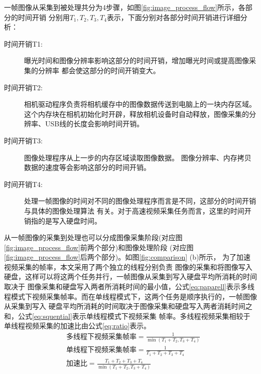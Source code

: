 	一帧图像从采集到被处理共分为4步骤，如图\ref{fig:image_process_flow}所示，各部分的时间开销
	分别用$T_1,T_2,T_3,T_4$表示，下面分别对各部分时间开销进行详细分析：
	\begin{description}
    \item[时间开销T1:] 曝光时间和图像分辨率影响这部分的时间开销，增加曝光时间或提高图像采集的分辨率
	都会使这部分的时间开销变大。
    \item[时间开销T2:] 相机驱动程序负责将相机缓存中的图像数据传送到电脑上的一块内存区域。
	这个内存块在相机初始化时开辟，释放相机设备时自动释放，图像采集的分辨率、USB线的长度会影响时间开销。
    \item[时间开销T3:] 图像处理程序从上一步的内存区域读取图像数据。
					图像分辨率、内存拷贝数据的速度等会影响这部分的时间开销。
	\item[时间开销T4:] 处理一帧图像的时间对不同的图像处理程序而言是不同，这部分的时间开销与具体的图像处理算法
	有关。对于高速视频采集任务而言，这里的时间开销指的是写入硬盘时间。
	\end{description}
	从一帧图像的采集到处理也可以分成图像采集阶段(对应图\ref{fig:image_process_flow}前两个部分)和图像处理阶段
	(对应图\ref{fig:image_process_flow}后两个部分)。如图\ref{fig:comparison} (b)所示，
	为了加速视频采集的帧率，本文采用了两个独立的线程分别负责
	图像的采集和将图像写入硬盘，这样可以将这两个任务并行，一帧图像从采集到写入硬盘平均所消耗的时间取决于
	图像采集和硬盘写入两者所消耗时间的最小值，公式\ref{eq:paparell}表示多线程模式下视频采集帧率。而在单线程模式下，这两个任务是顺序执行的，一帧图像从采集到写入
	硬盘平均所消耗的时间取决于图像采集和硬盘写入两者消耗时间之和，公式\ref{eq:squential}表示单线程模式下视频采集
	帧率。多线程视频采集相较于单线程视频采集的加速比由公式\ref{eq:ratio}表示。
	\begin{align}
		&\text{多线程下视频采集帧率}=\frac{1}{\min(T_1+T_2,T_3+T_4)} \label{eq:paparell}\\
		&\text{单线程下视频采集帧率}=\frac{1}{T_1+T_2+T_3+T_4} \label{eq:squential}\\
		&\text{加速比}=\frac{T_1+T_2+T_3+T_4}{\min(T_1+T_2,T_3+T_4)} \label{eq:ratio}
	\end{align}
